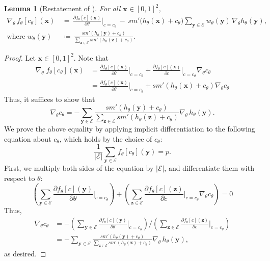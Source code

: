\documentclass[11pt]{article}
\theoremstyle{plain}
\newtheorem{lemma}{Lemma}[section]
\theoremstyle{definition}
\theoremstyle{remark}
\begin{document}
\begin{lemma}[Restatement of ]
For all $\mathbf{x} \in [0,1]^2$,
\begin{align*}
\nabla_\theta\, f_\theta[c_\theta](\mathbf{x})
\,&=\, \frac{\partial f_\theta[c](\mathbf{x})}{\partial \theta}\bigg|_{c = c_\theta}
\,-\, \mathit{sm}'\bigl(h_\theta(\mathbf{x}) + c_\theta\bigr)
\sum_{\mathbf{y} \in \mathcal{E}} w_\theta(\mathbf{y})\, \nabla_\theta h_\theta(\mathbf{y}),
\\
\text{where }
w_\theta(\mathbf{y}) \,&\coloneqq\, \frac{\mathit{sm}'(h_\theta(\mathbf{y}) + c_\theta)}{\sum_{\mathbf{z} \in \mathcal{E}} \mathit{sm}'(h_\theta(\mathbf{z}) + c_\theta)}.
\end{align*}
\end{lemma}
\begin{proof}[Proof]
Let $\mathbf{x} \in [0,1]^2$. Note that
\begin{align*}
    \nabla_\theta\;f_\theta[c_\theta](\mathbf{x})
    & = \frac{\partial f_\theta[c](\mathbf{x})}{\partial\theta}\Big|_{c = c_\theta}
        + \frac{\partial f_\theta[c](\mathbf{x})}{\partial c}\Big|_{c = c_\theta} \nabla_\theta c_\theta
    \\
    & = \frac{\partial f_\theta[c](\mathbf{x})}{\partial\theta}\Big|_{c = c_\theta}
        + \mathit{sm}'(h_\theta(\mathbf{x}) + c_\theta) \nabla_\theta c_\theta
\end{align*}
Thus, it suffices to show that
\[
\nabla_\theta c_\theta =
 {-}  \sum_{\mathbf{y} \in \mathcal{E}}\frac{\mathit{sm}'(h_\theta(\mathbf{y}) + c_\theta)}{\sum_{\mathbf{z} \in \mathcal{E}} \mathit{sm}'(h_\theta(\mathbf{z}) + c_\theta)} \nabla_\theta\, h_\theta(\mathbf{y}).
\]
We prove the above equality by applying implicit differentiation to the following equation about $c_\theta$, which holds by the choice of $c_\theta$:
\[
\frac{1}{|\mathcal{E}|} \sum_{\mathbf{y} \in \mathcal{E}} f_{\theta}[c_\theta](\mathbf{y}) = p.
\]
First, we multiply both sides of the equation by $|\mathcal{E}|$, and differentiate them with respect to $\theta$:
\[
\left(\sum_{\mathbf{y} \in \mathcal{E}} \frac{\partial f_{\theta}[c](\mathbf{y})}{\partial \theta}\Big|_{c = c_\theta}\right)
+
\left(\sum_{\mathbf{z} \in \mathcal{E}} \frac{\partial f_{\theta}[c](\mathbf{z})}{\partial c}\Big|_{c = c_\theta} \nabla_\theta c_\theta\right)
= 0
\]
Thus,
\begin{align*}
    \nabla_\theta c_\theta
    & {} = {-} \left(\sum_{\mathbf{y} \in \mathcal{E}} \frac{\partial f_{\theta}[c](\mathbf{y})}{\partial \theta}\Big|_{c = c_\theta}\right) \Bigg/  \left(\sum_{\mathbf{z} \in \mathcal{E}} \frac{\partial f_{\theta}[c](\mathbf{z})}{\partial c}\Big|_{c = c_\theta}\right)
    \\
    & =  {-} \sum_{\mathbf{y} \in \mathcal{E}} \frac{\mathit{sm}'(h_\theta(\mathbf{y}) + c_\theta)}{\sum_{\mathbf{z} \in \mathcal{E}} \mathit{sm}'(h_\theta(\mathbf{z}) + c_\theta)} \nabla_\theta\, h_\theta(\mathbf{y}),
\end{align*}
as desired.
\end{proof}
\end{document}
